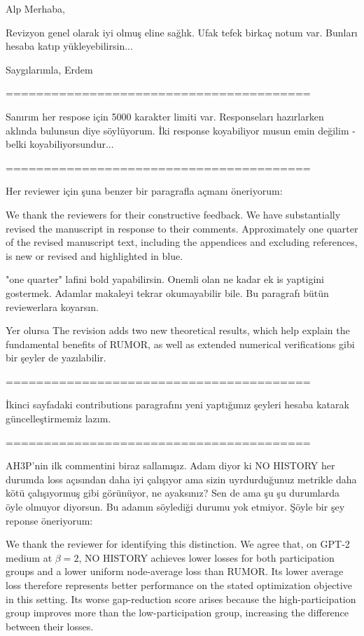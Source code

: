 Alp Merhaba,

Revizyon genel olarak iyi olmuş eline sağlık. Ufak tefek birkaç notum var. Bunları hesaba katıp yükleyebilirsin...

Saygılarımla,
Erdem

========================================  

Sanırım her respose için 5000 karakter limiti var. Responseları hazırlarken aklında bulunsun diye söylüyorum. İki response koyabiliyor musun emin değilim - belki koyabiliyorsundur...

========================================  

Her reviewer için şuna benzer bir paragrafla açmanı öneriyorum:

We thank the reviewers for their constructive feedback. We have substantially revised the manuscript in response to their comments. Approximately one quarter of the revised manuscript text, including the appendices and excluding references, is new or revised and highlighted in blue.

"one quarter" lafini bold yapabilirsin. Onemli olan ne kadar ek is yaptigini gostermek. Adamlar makaleyi tekrar okumayabilir bile. Bu paragrafı bütün reviewerlara koyarsın.

Yer olursa The revision adds two new theoretical results, which help explain the fundamental benefits of RUMOR, as well as extended numerical verifications gibi bir şeyler de yazılabilir.

========================================  

İkinci sayfadaki contributions paragrafını yeni yaptığımız şeyleri hesaba katarak güncelleştirmemiz lazım.

========================================  

AH3P'nin ilk commentini biraz sallamışız. Adam diyor ki NO HISTORY her durumda loss açısından daha iyi çalışıyor ama sizin uyrdurduğunuz metrikle daha kötü çalışıyormuş gibi görünüyor, ne ayaksınız? Sen de ama şu şu durumlarda öyle olmuyor diyorsun. Bu adamın söylediği durumu yok etmiyor. Şöyle bir şey reponse öneriyorum:

We thank the reviewer for identifying this distinction. We agree that, on GPT-2 medium at \(\beta=2\), NO HISTORY achieves lower losses for both participation groups and a lower uniform node-average loss than RUMOR. Its lower average loss therefore represents better performance on the stated optimization objective in this setting. Its worse gap-reduction score arises because the high-participation group improves more than the low-participation group, increasing the difference between their losses.

